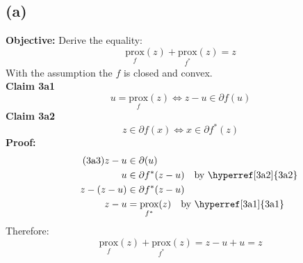 \documentclass[]{article}
\begin{document}
    \subsection*{(a)}
        \textbf{Objective:} Derive the equality: $$
        \underset{f}{\text{prox}} \left(
            z
        \right) + 
        \underset{f^*}{\text{prox}}(z) = z
        $$
        With the assumption the $f$ is closed and convex. 
        \\
        \textbf{Claim 3a1\label{3a1}}
        $$
            u = \underset{f}{\text{prox}}(z) \iff z - u\in \partial f(u)
        $$
        \textbf{Claim 3a2 \label{3a2}}
        $$
        z \in \partial f(x) \iff x\in \partial f^*(z)
        $$
        \textbf{Proof:}
        \begin{align*}\tag{3a3}\label{eqn:3a3}
            z-u &\in \partial (u) \\
            u &\in \partial f^*(z - u) \quad \text{by \hyperref[3a2]{3a2}}\\
            z - (z - u) &\in \partial f^*(z - u) \\
            z - u &= \underset{f^*}{\text{prox}}(z) \quad \text{by \hyperref[3a1]{3a1}}
        \end{align*}
        Therefore: 
        $$
        \underset{f}{\text{prox}} \left(
            z
        \right) + 
        \underset{f^*}{\text{prox}}(z) = z - u + u = z
        $$
\end{document}

